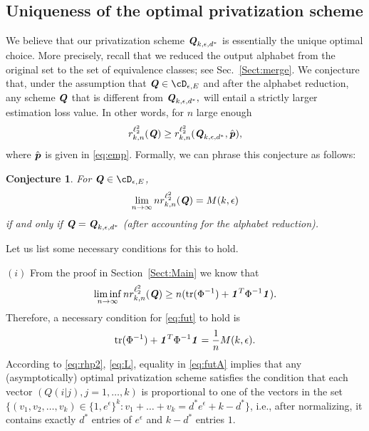 \documentclass[11pt,onecolumn]{IEEEtran}
\newtheorem{conjecture}{Conjecture}
\def\mathbi#1{{\textbf{\textit #1}}}
\DeclareMathOperator{\tr}{tr}
\begin{document}
\subsection{Uniqueness of the optimal privatization scheme}
We believe that our privatization scheme $\mathbi{Q}_{k,\epsilon,d^\ast}$ is essentially the unique optimal choice.
More precisely, recall that we reduced the output alphabet from the original set to the set of equivalence classes; see 
Sec.~\ref{Sect:merge}. We conjecture that, under the assumption that $\mathbi{Q} \in \cD_{\epsilon,E}$ and after
the alphabet reduction, any scheme $\mathbi{Q}$ that is different from $\mathbi{Q}_{k,\epsilon,d^\ast},$
will entail a strictly larger estimation loss value. In other words, for $n$ large enough
$$
r_{k,n}^{\ell_2^2} (\mathbi{Q}) \ge r_{k,n}^{\ell_2^2} (\mathbi{Q}_{k,\epsilon,d^\ast}, \hat{\mathbi{p}}),
$$
where $\hat{\mathbi{p}}$ is given in \eqref{eq:emp}.
Formally, we can phrase this conjecture as follows: 
\begin{conjecture}\label{cj:u1}
For $\mathbi{Q} \in \cD_{\epsilon,E}$,
\begin{equation}\label{eq:fut}
\lim_{n\to \infty} n r_{k,n}^{\ell_2^2} (\mathbi{Q}) =
 M(k,\epsilon)
\end{equation}
if and only if $\mathbi{Q} = \mathbi{Q}_{k,\epsilon,d^\ast}$ (after accounting for the alphabet reduction).
\end{conjecture}


Let us list some necessary conditions for this to hold. 

\vspace*{.1in}$(i)$ From the proof in Section~\ref{Sect:Main} we know that
\begin{equation}\label{eq:unb}
\liminf_{n\to \infty} n r_{k,n}^{\ell_2^2} (\mathbi{Q}) \ge
n ( \tr(\Phi^{-1}) + \mathbi{1}^T \Phi^{-1} \mathbi{1} ).
\end{equation}
Therefore,  a necessary condition for \eqref{eq:fut} to hold is
\begin{equation}\label{eq:futA}
 \tr(\Phi^{-1}) + \mathbi{1}^T \Phi^{-1} \mathbi{1} =\frac 1n  M(k,\epsilon).
\end{equation}
According to \eqref{eq:rhp2}, \eqref{eq:L}, equality in \eqref{eq:futA} implies that any (asymptotically) optimal privatization scheme satisfies the condition that each vector $(Q(i|j), j=1,\dots,k)$ is proportional to one of the vectors in the set 
$\{(v_1,v_2,\dots,v_k) \in \{1, e^\epsilon\}^k: v_1+\dots+v_k=d^\ast e^\epsilon + k-d^\ast \}$, i.e., after normalizing, it contains exactly $d^\ast$ entries of $e^\epsilon$ and $k-d^\ast$ entries $1$. 
\end{document}
